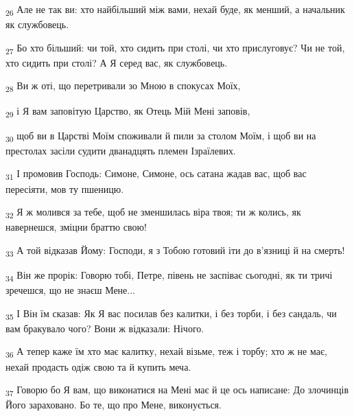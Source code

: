 \begin{tcolorbox}
\textsubscript{26} Але не так ви: хто найбільший між вами, нехай буде, як менший, а начальник як службовець.
\end{tcolorbox}
\begin{tcolorbox}
\textsubscript{27} Бо хто більший: чи той, хто сидить при столі, чи хто прислуговує? Чи не той, хто сидить при столі? А Я серед вас, як службовець.
\end{tcolorbox}
\begin{tcolorbox}
\textsubscript{28} Ви ж оті, що перетривали зо Мною в спокусах Моїх,
\end{tcolorbox}
\begin{tcolorbox}
\textsubscript{29} і Я вам заповітую Царство, як Отець Мій Мені заповів,
\end{tcolorbox}
\begin{tcolorbox}
\textsubscript{30} щоб ви в Царстві Моїм споживали й пили за столом Моїм, і щоб ви на престолах засіли судити дванадцять племен Ізраїлевих.
\end{tcolorbox}
\begin{tcolorbox}
\textsubscript{31} І промовив Господь: Симоне, Симоне, ось сатана жадав вас, щоб вас пересіяти, мов ту пшеницю.
\end{tcolorbox}
\begin{tcolorbox}
\textsubscript{32} Я ж молився за тебе, щоб не зменшилась віра твоя; ти ж колись, як навернешся, зміцни браттю свою!
\end{tcolorbox}
\begin{tcolorbox}
\textsubscript{33} А той відказав Йому: Господи, я з Тобою готовий іти до в'язниці й на смерть!
\end{tcolorbox}
\begin{tcolorbox}
\textsubscript{34} Він же прорік: Говорю тобі, Петре, півень не заспіває сьогодні, як ти тричі зречешся, що не знаєш Мене...
\end{tcolorbox}
\begin{tcolorbox}
\textsubscript{35} І Він їм сказав: Як Я вас посилав без калитки, і без торби, і без сандаль, чи вам бракувало чого? Вони ж відказали: Нічого.
\end{tcolorbox}
\begin{tcolorbox}
\textsubscript{36} А тепер каже їм хто має калитку, нехай візьме, теж і торбу; хто ж не має, нехай продасть одіж свою та й купить меча.
\end{tcolorbox}
\begin{tcolorbox}
\textsubscript{37} Говорю бо Я вам, що виконатися на Мені має й це ось написане: До злочинців Його зараховано. Бо те, що про Мене, виконується.
\end{tcolorbox}
